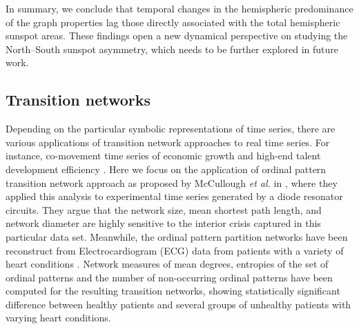 		In summary, we conclude that temporal changes in the hemispheric predominance of the graph properties lag those directly associated with the total hemispheric sunspot areas. These findings open a new dynamical perspective on studying the North--South sunspot asymmetry, which needs to be further explored in future work.


	\subsection{Transition networks}
	Depending on the particular symbolic representations of time series, there are various applications of transition network approaches to real time series. For instance, co-movement time series of economic growth and high-end talent development efficiency \cite{Zhang2018b}. Here we focus on the application of ordinal pattern transition network approach as proposed by McCullough {\textit{et al.}} in \cite{McCullough2015}, where they applied this analysis to experimental time series generated by a diode resonator circuits. They argue that the network size, mean shortest path length, and network diameter are highly sensitive to the interior crisis captured in this particular data set. Meanwhile, the ordinal pattern partition networks have been reconstruct from Electrocardiogram (ECG) data from patients with a variety of heart conditions \cite{Kulp2016b}. Network measures of mean degrees, entropies of the set of ordinal patterns and the number of non-occurring ordinal patterns have been computed for the resulting transition networks, showing statistically significant difference between healthy patients and several groups of unhealthy patients with varying heart conditions.


